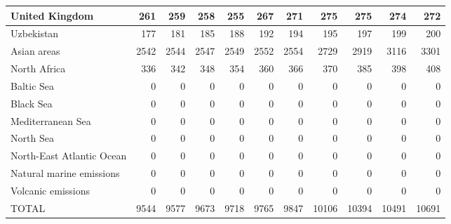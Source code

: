 \begin{table}
\begin{tabular}{|l|r|r|r|r|r|r|r|r|r|r|}
                United Kingdom&    261&    259&    258&    255&    267&    271&    275&    275&    274&    272\\\hline
                    Uzbekistan&    177&    181&    185&    188&    192&    194&    195&    197&    199&    200\\\hline
                   Asian areas&   2542&   2544&   2547&   2549&   2552&   2554&   2729&   2919&   3116&   3301\\\hline
                  North Africa&    336&    342&    348&    354&    360&    366&    370&    385&    398&    408\\\hline
                    Baltic Sea&      0&      0&      0&      0&      0&      0&      0&      0&      0&      0\\\hline
                     Black Sea&      0&      0&      0&      0&      0&      0&      0&      0&      0&      0\\\hline
             Mediterranean Sea&      0&      0&      0&      0&      0&      0&      0&      0&      0&      0\\\hline
                     North Sea&      0&      0&      0&      0&      0&      0&      0&      0&      0&      0\\\hline
     North-East Atlantic Ocean&      0&      0&      0&      0&      0&      0&      0&      0&      0&      0\\\hline
      Natural marine emissions&      0&      0&      0&      0&      0&      0&      0&      0&      0&      0\\\hline
            Volcanic emissions&      0&      0&      0&      0&      0&      0&      0&      0&      0&      0\\\hline\hline
                         TOTAL&   9544&   9577&   9673&   9718&   9765&   9847&  10106&  10394&  10491&  10691\\\hline
 \end{tabular}
 \end{table}
 
